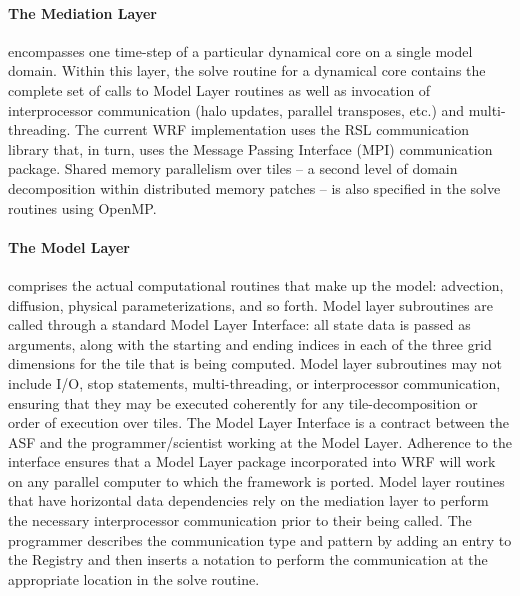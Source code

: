 \paragraph{The Mediation Layer} 
encompasses one time-step of a particular dynamical
core on a single model domain. Within this layer, the solve routine for
a dynamical core contains the complete set of calls to Model Layer
routines as well as invocation of interprocessor communication (halo
updates, parallel transposes, etc.) and multi-threading. The current
WRF implementation uses the RSL communication library
\citep{michalak00} that, in turn, uses the Message Passing Interface
(MPI) communication package.  Shared memory parallelism over tiles
-- a second level of domain decomposition within distributed
memory patches -- is also specified in the solve routines using
OpenMP.  

\paragraph{The Model Layer} 
comprises the actual computational routines that make
up the model:  advection, diffusion, physical parameterizations, and so
forth. Model layer subroutines are called through a standard Model
Layer Interface: all state data is passed as arguments, along with the
starting and ending indices in each of the three grid dimensions for
the tile that is being computed. Model layer subroutines may not
include I/O, stop statements, multi-threading, or interprocessor
communication, ensuring that they may be executed coherently for any
tile-decomposition or order of execution over tiles. The Model Layer
Interface is a contract between the ASF and the programmer/scientist
working at the Model Layer. Adherence to the interface ensures that a
Model Layer package incorporated into WRF will work on any parallel
computer to which the framework is ported. Model layer routines that
have horizontal data dependencies rely on the mediation layer to perform the
necessary interprocessor communication prior to their being called. The
programmer describes the communication type and pattern by adding an
entry to the Registry and then inserts a notation to perform the
communication at the appropriate location in the solve routine.

